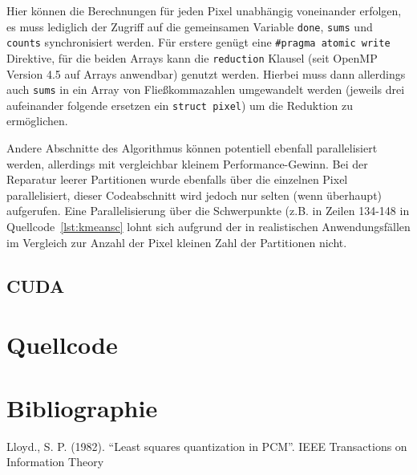 \documentclass[ngerman, cd=lightcolor, cdmath=false]{tudscrreprt}
\begin{document}


Hier können die Berechnungen für jeden Pixel unabhängig voneinander erfolgen, es
muss lediglich der Zugriff auf die gemeinsamen Variable \texttt{done},
\texttt{sums} und \texttt{counts} synchronisiert werden. Für erstere genügt eine
\texttt{\#pragma atomic write} Direktive, für die beiden Arrays kann die
\texttt{reduction} Klausel (seit OpenMP Version 4.5 auf Arrays anwendbar)
genutzt werden. Hierbei muss dann allerdings auch \texttt{sums} in ein Array
von Fließkommazahlen umgewandelt werden (jeweils drei aufeinander folgende
ersetzen ein \texttt{struct pixel}) um die Reduktion zu ermöglichen.

Andere Abschnitte des Algorithmus können potentiell ebenfall parallelisiert
werden, allerdings mit vergleichbar kleinem Performance-Gewinn. Bei der
Reparatur leerer Partitionen wurde ebenfalls über die einzelnen Pixel
parallelisiert, dieser Codeabschnitt wird jedoch nur selten (wenn überhaupt)
aufgerufen. Eine Parallelisierung über die Schwerpunkte (z.B. in Zeilen 134-148
in Quellcode~\ref{lst:kmeansc} lohnt sich aufgrund der in realistischen
Anwendungsfällen im Vergleich zur Anzahl der Pixel kleinen Zahl der Partitionen
nicht.

\section{CUDA}

\chapter{Quellcode}

\chapter{Bibliographie}
\begin{thebibliography}{1}
Lloyd., S. P. (1982). ``Least squares quantization in PCM''. IEEE Transactions
on Information Theory
\end{thebibliography}
\end{document}
